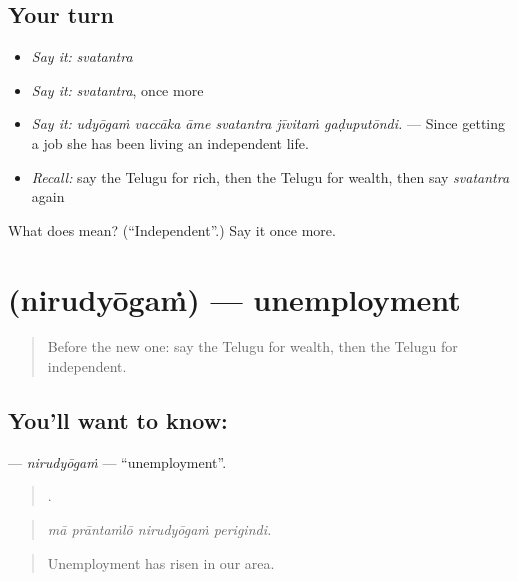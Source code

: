 \subsection*{Your turn}
\begin{itemize}
\raggedright
  \item \emph{Say it:} \emph{svatantra}
  \item \emph{Say it:} \emph{svatantra}, once more
  \item \emph{Say it:} \emph{udyōgaṁ vaccāka āme svatantra jīvitaṁ gaḍuputōndi.} — Since getting a job she has been living an independent life.
  \item \emph{Recall:} say the Telugu for rich, then the Telugu for wealth, then say \emph{svatantra} again
\end{itemize}

\begin{tcolorbox}[breakable,colback=teal!4,colframe=teal!35!black,title={Before you move on}]
What does  mean? (\textquotedblleft{}Independent\textquotedblright{}.) Say it once more.
\end{tcolorbox}
\section[\texorpdfstring{\te{నిరుద్యోగం} (nirudyōgaṁ)}{నిరుద్యోగం (nirudyōgaṁ)}]{ (nirudyōgaṁ) — unemployment}

\label{lesson:TE-C404-nirudyogam}



\begin{quote}
Before the new one: say the Telugu for wealth, then the Telugu for independent.
\end{quote}

\subsection*{You'll want to know: }
\textbf{} — \emph{nirudyōgaṁ} — \textquotedblleft{}unemployment\textquotedblright{}.

\begin{quote}
   .
\end{quote}

\begin{quote}
\emph{mā prāntaṁlō nirudyōgaṁ perigindi.}
\end{quote}

\begin{quote}
Unemployment has risen in our area.
\end{quote}

